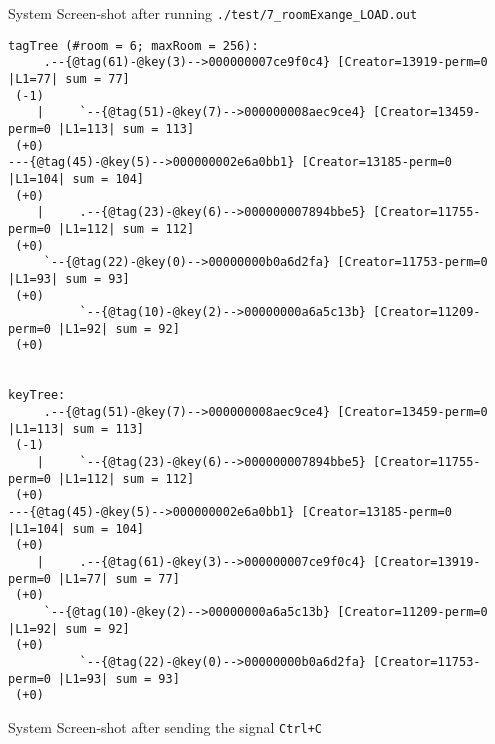 \begin{center}\begin{large}
System Screen-shot after running \verb |./test/7_roomExange_LOAD.out|
\end{large}\end{center}
\begin{indentPar}{1.25cm}
\begin{scriptsize}\begin{verbatim}
tagTree (#room = 6; maxRoom = 256):
     .--{@tag(61)-@key(3)-->000000007ce9f0c4} [Creator=13919-perm=0 |L1=77| sum = 77]
 (-1)
    |     `--{@tag(51)-@key(7)-->000000008aec9ce4} [Creator=13459-perm=0 |L1=113| sum = 113]
 (+0)
---{@tag(45)-@key(5)-->000000002e6a0bb1} [Creator=13185-perm=0 |L1=104| sum = 104]
 (+0)
    |     .--{@tag(23)-@key(6)-->000000007894bbe5} [Creator=11755-perm=0 |L1=112| sum = 112]
 (+0)
     `--{@tag(22)-@key(0)-->00000000b0a6d2fa} [Creator=11753-perm=0 |L1=93| sum = 93]
 (+0)
          `--{@tag(10)-@key(2)-->00000000a6a5c13b} [Creator=11209-perm=0 |L1=92| sum = 92]
 (+0)


keyTree:
     .--{@tag(51)-@key(7)-->000000008aec9ce4} [Creator=13459-perm=0 |L1=113| sum = 113]
 (-1)
    |     `--{@tag(23)-@key(6)-->000000007894bbe5} [Creator=11755-perm=0 |L1=112| sum = 112]
 (+0)
---{@tag(45)-@key(5)-->000000002e6a0bb1} [Creator=13185-perm=0 |L1=104| sum = 104]
 (+0)
    |     .--{@tag(61)-@key(3)-->000000007ce9f0c4} [Creator=13919-perm=0 |L1=77| sum = 77]
 (+0)
     `--{@tag(10)-@key(2)-->00000000a6a5c13b} [Creator=11209-perm=0 |L1=92| sum = 92]
 (+0)
          `--{@tag(22)-@key(0)-->00000000b0a6d2fa} [Creator=11753-perm=0 |L1=93| sum = 93]
 (+0)
\end{verbatim}\end{scriptsize}
\end{indentPar}

\begin{center}\begin{large}
System Screen-shot after sending the signal \verb|Ctrl+C|
\end{large}\end{center}

